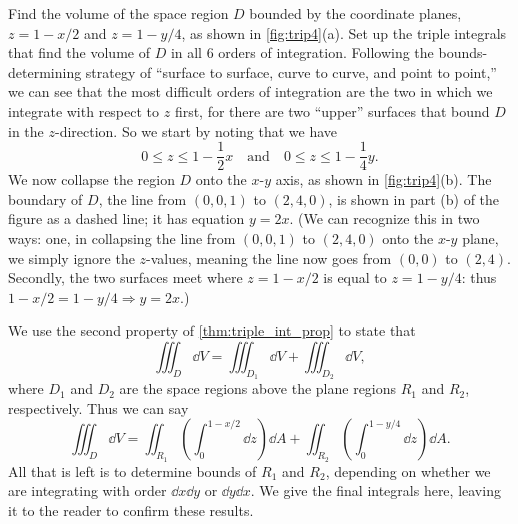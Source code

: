 \begin{example}\label{ex_trip4}
Find the volume of the space region $D$ bounded by the coordinate planes, $z=1-x/2$ and $z=1-y/4$, as shown in \autoref{fig:trip4}(a). Set up the triple integrals that find the volume of $D$ in all 6 orders of integration.
\solution
Following the bounds-determining strategy of ``surface to surface, curve to curve, and point to point,''  we can see that the most difficult orders of integration are the two in which we integrate with respect to $z$ first, for there are two ``upper'' surfaces that bound $D$ in the $z$-direction. So we start by noting that we have 
\[0\leq z\leq 1-\frac12x \quad\text{and}\quad 0\leq z\leq 1-\frac14y.\]
We now collapse the region $D$ onto the $x$-$y$ axis, as shown in \autoref{fig:trip4}(b). The boundary of $D$, the line from $(0,0,1)$ to $(2,4,0)$, is shown in part (b) of the figure as a dashed line; it has equation $y=2x$. (We can recognize this in two ways: one, in collapsing the line from $(0,0,1)$ to $(2,4,0)$ onto the $x$-$y$ plane, we simply ignore the $z$-values, meaning the line now goes from $(0,0)$ to $(2,4)$. Secondly, the two surfaces meet where $z=1-x/2$ is equal to $z=1-y/4$: thus $1-x/2=1-y/4 \Rightarrow y=2x.$)

We use the second property of \autoref{thm:triple_int_prop} to state that 
\[\iiint_D \dd V = \iiint_{D_1}\dd V + \iiint_{D_2}\dd V,\]
where $D_1$ and $D_2$ are the space regions above the plane regions $R_1$ and $R_2$, respectively. Thus we can say
\[
\iiint_D\dd V
= \iint_{R_1}\left(\int_0^{1-x/2}\dd z\right)\dd A + \iint_{R_2}\left(\int_0^{1-y/4}\dd z\right)\dd A.
\]
All that is left is to determine bounds of $R_1$ and $R_2$, depending on whether we are integrating with order $\dd x\dd y$ or $\dd y\dd x$. We give the final integrals here, leaving it to the reader to confirm these results.\bigskip


\end{example}
